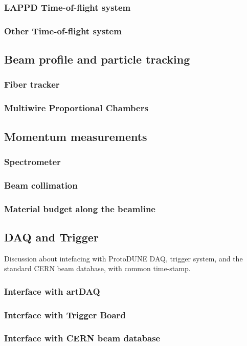 \subsubsection{LAPPD Time-of-flight system}

\subsubsection{Other Time-of-flight system}

\subsection{Beam profile and particle tracking}

\subsubsection{Fiber tracker}

\subsubsection{Multiwire Proportional Chambers}

\subsection{Momentum measurements}

\subsubsection{Spectrometer}

\subsubsection{Beam collimation}

\subsubsection{Material budget along the beamline}

\subsection{DAQ and Trigger}
Discussion about intefacing with ProtoDUNE DAQ, trigger system, and the standard CERN beam database, with common time-stamp.

\subsubsection{Interface with artDAQ}

\subsubsection{Interface with Trigger Board}

\subsubsection{Interface with CERN beam database}




